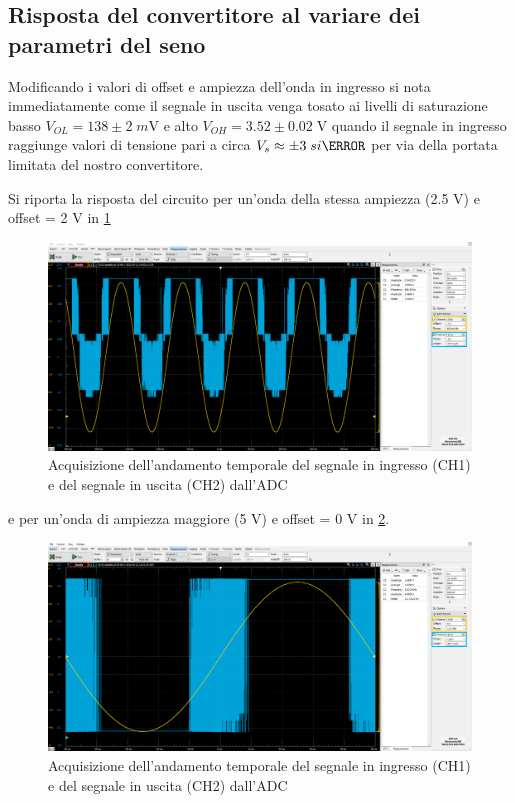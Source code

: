 \documentclass[10pt, a4paper, italian]{article}
\begin{document}
\subsection{Risposta del convertitore al variare dei parametri del seno}
\label{sbs: adcresp}
Modificando i valori di offset e ampiezza dell'onda in ingresso si nota
immediatamente come il segnale in uscita venga tosato ai livelli di
saturazione basso $V_{OL} = 138 \pm 2 \; \si{m\V}$ e alto
$V_{OH} = 3.52 \pm 0.02 \; \si{\V}$ quando il segnale in ingresso raggiunge
valori di tensione pari a circa $V_s \approx \pm 3 \; si{\V}$ per via della
portata limitata del nostro convertitore.

Si riporta la risposta del circuito per un'onda della stessa ampiezza (2.5 V)
e offset = 2 V in \cref{fig: sinofs}
\begin{figure}[htbp]
    \centering
	\includegraphics[width=\textwidth]{sin10hz2.5vofs2v}
    \caption{Acquisizione dell'andamento temporale del segnale in ingresso
    (CH1) e del segnale in uscita (CH2) dall'ADC
    \label{fig: sinofs}}
\end{figure}
e per un'onda di ampiezza maggiore (5 V) e offset = 0 V in \cref{fig: sinsat}.
\begin{figure}[htbp]
    \centering
	\includegraphics[width=\textwidth]{sin10hz5v}
    \caption{Acquisizione dell'andamento temporale del segnale in ingresso
    (CH1) e del segnale in uscita (CH2) dall'ADC
    \label{fig: sinsat}}
\end{figure}
\end{document}
